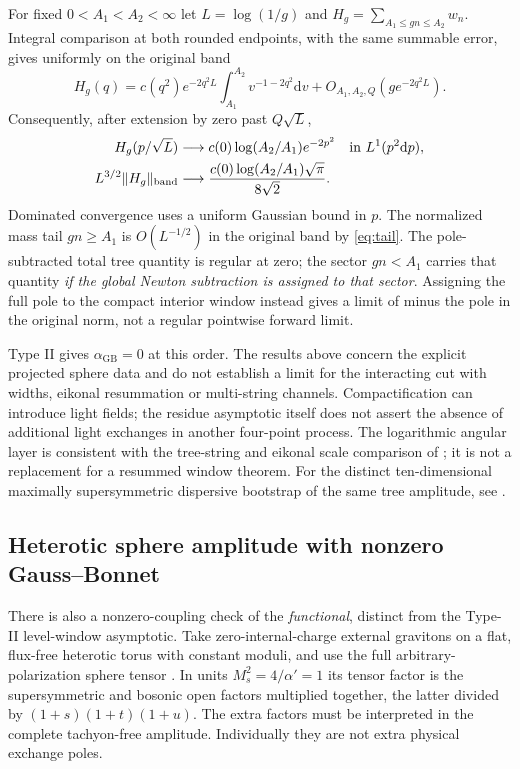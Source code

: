 \documentclass[11pt,a4paper]{article}
\theoremstyle{definition}
\theoremstyle{remark}
\newcommand{\dS}{\mathrm{d}}
\newcommand{\GB}{\alpha_{\mathrm{GB}}}
\begin{document}
For fixed $0<A_1<A_2<\infty$ let
$L=\log(1/g)$ and $H_g=\sum_{A_1\le gn\le A_2}w_n$. Integral comparison at both rounded endpoints, with the same summable error, gives uniformly on the original band
\[
 H_g(q)=c(q^2)e^{-2q^2L}
           \int_{A_1}^{A_2}v^{-1-2q^2}\dS v
                    +O_{A_1,A_2,Q}(g e^{-2q^2L}).
\]
Consequently, after extension by zero past $Q\sqrt L$,
\[
 \begin{aligned}
 H_g(p/\sqrt L)&\longrightarrow
   c(0)\log(A_2/A_1)e^{-2p^2}
       &&\text{in }L^1(p^2\dS p),\\
 L^{3/2}\|H_g\|_{\rm band}&\longrightarrow
      \frac{c(0)\log(A_2/A_1)\sqrt\pi}{8\sqrt2}.
 \end{aligned}
\]
Dominated convergence uses a uniform Gaussian bound in $p$. The normalized mass tail $gn\ge A_1$ is $O(L^{-1/2})$ in the original band by \eqref{eq:tail}. The pole-subtracted total tree quantity is regular at zero; the sector $gn<A_1$ carries that quantity \emph{if the global Newton subtraction is assigned to that sector}. Assigning the full pole to the compact interior window instead gives a limit of minus the pole in the original norm, not a regular pointwise forward limit.

Type II gives $\GB=0$ at this order. The results above concern the explicit projected sphere data and do not establish a limit for the interacting cut with widths, eikonal resummation or multi-string channels. Compactification can introduce light fields; the residue asymptotic itself does not assert the absence of additional light exchanges in another four-point process. The logarithmic angular layer is consistent with the tree-string and eikonal scale comparison of \cite[Secs.~2.1 and 2.4]{HZ}; it is not a replacement for a resummed window theorem. For the distinct ten-dimensional maximally supersymmetric dispersive bootstrap of the same tree amplitude, see \cite{Xu}.

\subsection{Heterotic sphere amplitude with nonzero Gauss--Bonnet}
\label{sec:heterotic}
There is also a nonzero-coupling check of the \emph{functional}, distinct from the Type-II level-window asymptotic. Take zero-internal-charge external gravitons on a flat, flux-free heterotic torus with constant moduli, and use the full arbitrary-polarization sphere tensor \cite[App.~C, Eqs.~(119)--(121)]{CHLi}. In units $M_s^2=4/\alpha'=1$ its tensor factor is the supersymmetric and bosonic open factors multiplied together, the latter divided by $(1+s)(1+t)(1+u)$. The extra factors must be interpreted in the complete tachyon-free amplitude. Individually they are not extra physical exchange poles.
\end{document}
